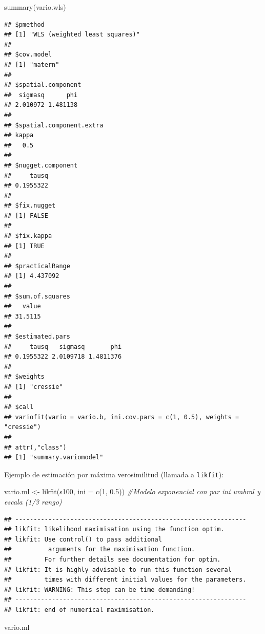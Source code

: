 \documentclass[
  spanish,
]{book}
\newenvironment{Shaded}{\begin{snugshade}}{\end{snugshade}}
\newcommand{\AttributeTok}[1]{\textcolor[rgb]{0.77,0.63,0.00}{#1}}
\newcommand{\CommentTok}[1]{\textcolor[rgb]{0.56,0.35,0.01}{\textit{#1}}}
\newcommand{\DecValTok}[1]{\textcolor[rgb]{0.00,0.00,0.81}{#1}}
\newcommand{\FloatTok}[1]{\textcolor[rgb]{0.00,0.00,0.81}{#1}}
\newcommand{\FunctionTok}[1]{\textcolor[rgb]{0.00,0.00,0.00}{#1}}
\newcommand{\NormalTok}[1]{#1}
\newcommand{\OtherTok}[1]{\textcolor[rgb]{0.56,0.35,0.01}{#1}}
\theoremstyle{break}
\theoremstyle{definition}
\theoremstyle{definition}
\theoremstyle{definition}
\theoremstyle{definition}
\theoremstyle{remark}
\begin{document}
\begin{Shaded}
\begin{Highlighting}[]
\FunctionTok{summary}\NormalTok{(vario.wls)}
\end{Highlighting}
\end{Shaded}

\begin{verbatim}
## $pmethod
## [1] "WLS (weighted least squares)"
## 
## $cov.model
## [1] "matern"
## 
## $spatial.component
##  sigmasq      phi 
## 2.010972 1.481138 
## 
## $spatial.component.extra
## kappa 
##   0.5 
## 
## $nugget.component
##     tausq 
## 0.1955322 
## 
## $fix.nugget
## [1] FALSE
## 
## $fix.kappa
## [1] TRUE
## 
## $practicalRange
## [1] 4.437092
## 
## $sum.of.squares
##   value 
## 31.5115 
## 
## $estimated.pars
##     tausq   sigmasq       phi 
## 0.1955322 2.0109718 1.4811376 
## 
## $weights
## [1] "cressie"
## 
## $call
## variofit(vario = vario.b, ini.cov.pars = c(1, 0.5), weights = "cressie")
## 
## attr(,"class")
## [1] "summary.variomodel"
\end{verbatim}

Ejemplo de estimación por máxima verosimilitud (llamada a \texttt{likfit}):

\begin{Shaded}
\begin{Highlighting}[]
\NormalTok{vario.ml }\OtherTok{\textless{}{-}} \FunctionTok{likfit}\NormalTok{(s100, }\AttributeTok{ini =} \FunctionTok{c}\NormalTok{(}\DecValTok{1}\NormalTok{, }\FloatTok{0.5}\NormalTok{)) }\CommentTok{\#Modelo exponencial con par ini umbral y escala (1/3 rango)}
\end{Highlighting}
\end{Shaded}

\begin{verbatim}
## ---------------------------------------------------------------
## likfit: likelihood maximisation using the function optim.
## likfit: Use control() to pass additional
##          arguments for the maximisation function.
##         For further details see documentation for optim.
## likfit: It is highly advisable to run this function several
##         times with different initial values for the parameters.
## likfit: WARNING: This step can be time demanding!
## ---------------------------------------------------------------
## likfit: end of numerical maximisation.
\end{verbatim}

\begin{Shaded}
\begin{Highlighting}[]
\NormalTok{vario.ml}
\end{Highlighting}
\end{Shaded}
\end{document}
